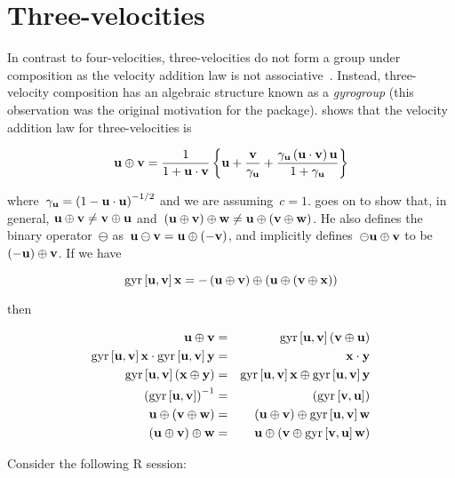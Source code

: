 \documentclass[ijoc,nonblindrev]{informs3} %
\begin{document}
\section{Three-velocities}

In contrast to four-velocities, three-velocities do not form a group
under composition as the velocity addition law is not
associative~\citep{ungar2006}.  Instead, three-velocity composition
has an algebraic structure known as a {\em gyrogroup} (this
observation was the original motivation for the package).
\citeauthor{ungar2006} shows that the velocity addition law for
three-velocities is

\begin{equation}
\mathbf u\oplus\mathbf v= \frac{1}{1+\mathbf u\cdot\mathbf v} \left\{ \mathbf u +
\frac{\mathbf v}{\gamma_\mathbf u} + \frac{\gamma_\mathbf u
  \left(\mathbf u\cdot\mathbf v\right)\mathbf u}{1+\gamma_\mathbf u} \right\}
\end{equation}
   
where~$\gamma_\mathbf u=\left(1-\mathbf u\cdot\mathbf u\right)^{-1/2}$ and we are
assuming~$c=1$.  \citeauthor{ungar2006} goes on to show that, in
general, $\mathbf u\oplus\mathbf v\neq\mathbf v\oplus\mathbf u$
and~$(\mathbf u\oplus\mathbf v)\oplus\mathbf w\neq\mathbf u\oplus(\mathbf v\oplus\mathbf w)$.  He also
defines the binary operator~$\ominus$
as~$\mathbf u\ominus\mathbf v=\mathbf u\oplus\left(-\mathbf v\right)$, and implicitly
defines~$\ominus\mathbf u\oplus\mathbf v$ to be~$\left(-\mathbf u\right)\oplus\mathbf v$.  If
we have

\begin{equation}
\operatorname{gyr}\left[{\mathbf u},{\mathbf v}\right]\mathbf x=-\left(\mathbf u\oplus\mathbf v\right)\oplus\left(\mathbf u\oplus\left(\mathbf v\oplus\mathbf x\right)\right)
\end{equation}

then

\begin{eqnarray}
\mathbf u\oplus\mathbf v &=&
\operatorname{gyr}\left[{\mathbf u},{\mathbf v}\right]\left(\mathbf v\oplus\mathbf u\right)\label{noncom}\\ \operatorname{gyr}\left[{\mathbf u},{\mathbf v}\right]\mathbf x\cdot\operatorname{gyr}\left[{\mathbf u},{\mathbf v}\right]\mathbf y
&=& \mathbf x\cdot\mathbf y\label{doteq}\\ \operatorname{gyr}\left[{\mathbf u},{\mathbf v}\right]\left(\mathbf x\oplus\mathbf y\right) &=&
\operatorname{gyr}\left[{\mathbf u},{\mathbf v}\right]\mathbf x\oplus\operatorname{gyr}\left[{\mathbf u},{\mathbf v}\right]\mathbf y\\ \left(\operatorname{gyr}\left[{\mathbf u},{\mathbf v}\right]\right)^{-1} &=&
\left(\operatorname{gyr}\left[{\mathbf v},{\mathbf u}\right]\right)\label{gyrinv}\\ \mathbf u\oplus\left(\mathbf v\oplus\mathbf w\right)
&=&\left(\mathbf u\oplus\mathbf v\right)\oplus\operatorname{gyr}\left[{\mathbf u},{\mathbf v}\right]\mathbf w\label{nonass1}\\ \left(\mathbf u\oplus\mathbf v\right)\oplus\mathbf w
&=&\mathbf u\oplus\left(\mathbf v\oplus\operatorname{gyr}\left[{\mathbf v},{\mathbf u}\right]\mathbf w\right)\label{nonass2}
\end{eqnarray}

Consider the following R session:
\end{document}
